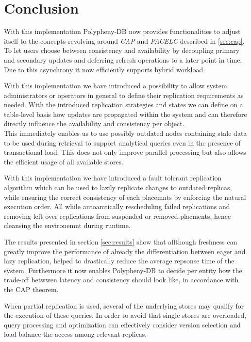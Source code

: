 \chapter{Conclusion}
\label{c:conclusion}


With this implementation Polypheny-DB now provides functionalities to adjust itself to the concepts revolving around \emph{CAP} and \emph{PACELC} described in \ref{sec:cap}.
To let users choose between consistency and availability by decoupling primary and secondary updates and deferring refresh operations to a later point in time.
Due to this asynchrony it now efficiently supports hybrid workload. 


With this implementation we have introduced a possibility to allow system administrators or operators in general to define their replication requirements as needed. 
With the introduced replication strategies and states we can define on a table-level basis how updates are propagated within the system and can therefore directly influence 
the availability and consistency per object.\\
This immediately enables us to use possibly outdated nodes containing stale data to be used during retrieval to support analytical queries even in the presence of transactional load.
This does not only improve parallel processing but also allows the efficient usage of all available stores.


With this implementation we have introduced a fault tolerant replication algorithm which can be used to lazily replicate changes to outdated replicas,
while ensuring the correct consistency of each placemnts by enforcing the natural execution order. All while autoamtically rescheduling failed replications and removing left over
replications from suspended or removed placments, hence cleansing the environemnt during runtime.

The results presented in section \ref{sec:results} show that allthough freshness can greatly improve the performance of 
already the differentiation between eager and lazy replication, helped to drastically reduce the average repsonse time of the system.
Furthermore it now enables Polypheny-DB to decide per entity how the trade-off betwwen latency and consistency should look like, in accordance with the CAP theorem. 

When partial replication is used, several of the underlying stores may qualify
for the execution of these queries. In order to avoid that single stores are overloaded, query processing and optimization
can effectively consider version selection and load balance the access among relevant replicas.

